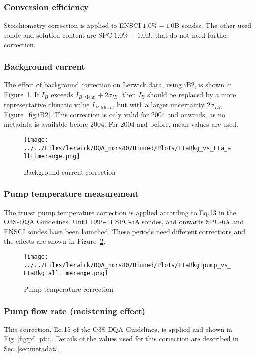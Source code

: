 \documentclass{article}
\begin{document}
%
\subsubsection{Conversion efficiency}
Stoichiometry correction is applied to ENSCI $1.0\%-1.0$B sondes. The other used sonde and solution content are SPC $1.0\%-1.0$B, that
do not need further correction.
%

\subsubsection{Background current}
The effect of background correction on Lerwick data, using iB2, is shown in Figure~\ref{fig:bkg}.
    If $I_B$ exceeds $I_{B,\text{Mean}}+2\sigma_{IB}$, then $I_B$
    should be replaced by a more representative climatic value $I_{B,\text{Mean}}$, but with a
    larger uncertainty $2\sigma_{IB}$, Figure~\ref{fig:iB2}.
This correction is only valid for 2004 and onwards, as no metadata is available before 2004. For 2004 and before, mean values
are used.


\begin{figure}
\centering
\texttt{[image: ../../Files/lerwick/DQA\_nors80/Binned/Plots/EtaBkg\_vs\_Eta\_alltimerange.png]}
\caption{Background current correction}
\label{fig:bkg}
\end{figure}
\subsubsection{Pump temperature measurement}

The truest pump temperature correction is applied according to Eq.13 in the O3S-DQA Guidelines.
Until 1995-11 SPC-5A sondes, and onwards  SPC-6A and ENSCI sondes have been launched.
These periods need different corrections and the effects are shown in Figure~\ref{fig:tpump}.


\begin{figure}
\centering
\texttt{[image: ../../Files/lerwick/DQA\_nors80/Binned/Plots/EtaBkgTpump\_vs\_EtaBkg\_alltimerange.png]}
\caption{Pump temperature correction }
\label{fig:tpump}
\end{figure}
\subsubsection{Pump flow rate (moistening effect)}
This correction, Eq.15 of the O3S-DQA Guidelines, is applied and shown in Fig~\ref{fig:pf_ptu}.
Details of the values used for this correction are described in Sec~\ref{sec:metadata}.
\end{document}
